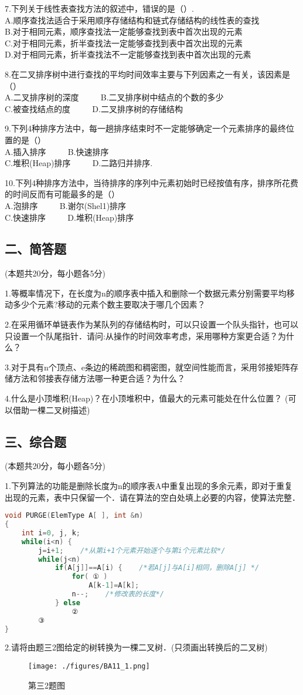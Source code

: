 7.下列关于线性表查找方法的叙述中，错误的是（）. \\
A.顺序查找法适合于采用顺序存储结构和链式存储结构的线性表的查找 \\
B.对于相同元素，顺序查找法一定能够查找到表中首次出现的元素 \\
C.对于相同元素，折半查找法一定能够查找到表中首次出现的元素 \\
D.对于相同元素，折半查找法不一定能够查找到表中首次出现的元素

8.在二叉排序树中进行查找的平均时间效率主要与下列因素之一有关，该因素是（） \\
A.二叉排序树的深度 $\qquad$ B.二叉排序树中结点的个数的多少 \\
C.被查找结点的度 $\qquad$ D.二叉排序树的存储结构

9.下列4种排序方法中，每一趟排序结束时不一定能够确定一个元素排序的最终位置的是（） \\
A.插入排序 $\qquad$ B.快速排序 \\
C.堆积(Heap)排序 $\qquad$ D.二路归并排序.

10.下列4种排序方法中，当待排序的序列中元素初始时已经按值有序，排序所花费的时间反而有可能最多的是（） \\
A.泡排序 $\qquad$ B.谢尔(Shel1)排序 \\
C.快速排序 $\qquad$ D.堆积(Heap)排序

\subsection{二、简答题}
(本题共20分，每小题各5分)

1.等概率情况下，在长度为n的顺序表中插入和删除一个数据元素分别需要平均移动多少个元素?移动的元素个数主要取决于哪几个因素？

2.在采用循环单链表作为某队列的存储结构时，可以只设置一个队头指针，也可以只设置一个队尾指针．请问:从操作的时间效率考虑，采用哪种方案更合适？为什么？

3.对于具有n个顶点、e条边的稀疏图和稠密图，就空间性能而言，采用邻接矩阵存储方法和邻接表存储方法哪一种更合适？为什么？

4.什么是小顶堆积(Heap)？在小顶堆积中，值最大的元素可能处在什么位置？ (可以借助一棵二叉树描述)

\subsection{三、综合题}
(本题共20分，每小题各5分)

1.下列算法的功能是删除长度为n的顺序表A中重复出现的多余元素，即对于重复出现的元素，表中只保留一个．请在算法的空白处填上必要的内容，使算法完整．
\begin{lstlisting}[language=cpp]
void PURGE(ElemType A[ ], int &n)
{
    int i=0, j, k;
    while(i<n) {
        j=i+1;    /*从第i+1个元素开始逐个与第i个元素比较*/
        while(j<n)
            if(A[j]]==A[i) {    /*若A[j]与A[i]相同，删除A[j] */
                for( ① )
                    A[k-1]=A[k];
                n--;    /*修改表的长度*/
            } else
                ②
        ③
}
\end{lstlisting}

2.请将由题三2图给定的树转换为一棵二叉树．(只须画出转换后的二叉树)
\begin{figure}[ht]
\centering
\texttt{[image: ./figures/BA11\_1.png]}
\caption{第三2题图} \label{BA11_fig1}
\end{figure}
